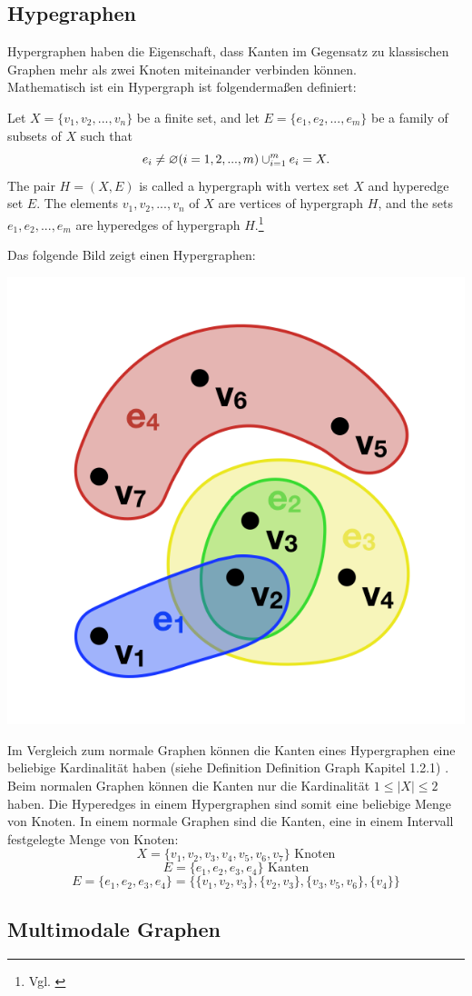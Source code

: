 \subsection{Hypegraphen}
Hypergraphen haben die Eigenschaft, dass Kanten im Gegensatz zu klassischen Graphen mehr als zwei Knoten miteinander verbinden können.
\\Mathematisch ist ein Hypergraph ist folgendermaßen definiert:
\begin{definition}
	Let $X=\{v_{1}, v_{2},...,v_{n}\}$ be a finite set,
	and let $E=\{e_{1},e_{2},...,e_{m}\}$ be a family of subsets of $X$ such that
	\[e_{i} \neq \varnothing (i=1,2,...,m) \\
	\cup_{i=1}^{m}e_{i}=X.
	\]
	The pair $H=(X,E)$ is called a hypergraph with vertex set $X$
	and hyperedge set $E$. The elements $v_{1}, v_{2},...,v_{n}$ of $X$ are vertices
	of hypergraph $H$, and the sets $e_{1}, e_{2},...,e_{m}$ are hyperedges of hypergraph $H$.\footnote{Vgl. \cite[Seite 2]{zhang2018hypergraph}}
\end{definition}
Das folgende Bild zeigt einen Hypergraphen:
\begin{center}
	\includegraphics[scale = 0.5]{./images/Hypergraph2.png}
\end{center}
Im Vergleich zum normale Graphen können die Kanten eines Hypergraphen eine beliebige Kardinalität haben (siehe Definition Definition Graph Kapitel 1.2.1) . Beim normalen Graphen können die Kanten nur die Kardinalität $1 \leq |X| \leq 2$
haben. Die Hyperedges in einem Hypergraphen sind somit eine beliebige Menge von Knoten. In einem normale Graphen sind die Kanten, eine in einem Intervall festgelegte Menge von Knoten:
    \[X = \{v_{1}, v_{2}, v_{3}, v_{4}, v_{5}, v_{6}, v_{7}\} \text{ Knoten}\]
    \[E=\{e_{1}, e_{2}, e_{3}, e_{4}\} \text{ Kanten}\]
    \[E=\{e_{1}, e_{2}, e_{3}, e_{4}\} = \{\{v_{1}, v_{2}, v_{3}\}, \{v_{2}, v_{3}\}, \{v_{3}, v_{5}, v_{6}\}, \{v_{4}\}\} \]
\subsection{Multimodale Graphen}